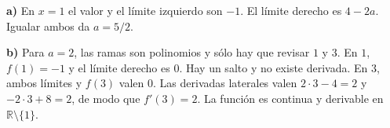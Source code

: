 \textbf{a)} En $x=1$ el valor y el límite izquierdo son $-1$. El límite derecho es $4-2a$. Igualar ambos da $\boxed{a=5/2}$.

\textbf{b)} Para $a=2$, las ramas son polinomios y sólo hay que revisar $1$ y $3$. En $1$, $f(1)=-1$ y el límite derecho es $0$. Hay un salto y no existe derivada. En $3$, ambos límites y $f(3)$ valen $0$. Las derivadas laterales valen $2\cdot3-4=2$ y $-2\cdot3+8=2$, de modo que $f'(3)=2$. La función es continua y derivable en $\mathbb R\setminus\{1\}$.
